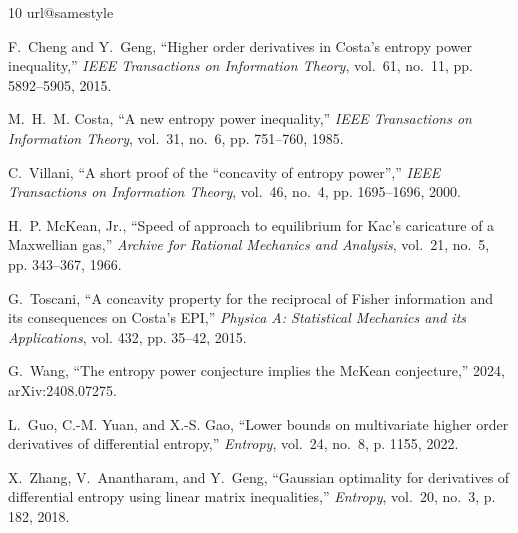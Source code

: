 \documentclass[10pt,letterpaper,journal]{IEEEtran}
\theoremstyle{plain}
\theoremstyle{definition}
\begin{document}
\begin{thebibliography}{10}
\providecommand{\url}[1]{#1}
\csname url@samestyle\endcsname
\providecommand{\newblock}{\relax}
\providecommand{\bibinfo}[2]{#2}
\providecommand{\BIBentrySTDinterwordspacing}{\spaceskip=0pt\relax}
\providecommand{\BIBentryALTinterwordstretchfactor}{4}
\providecommand{\BIBentryALTinterwordspacing}{\spaceskip=\fontdimen2\font plus
\BIBentryALTinterwordstretchfactor\fontdimen3\font minus
  \fontdimen4\font\relax}
\providecommand{\BIBforeignlanguage}[2]{{%
\expandafter\ifx\csname l@#1\endcsname\relax
\typeout{** WARNING: IEEEtran.bst: No hyphenation pattern has been}%
\typeout{** loaded for the language `#1'. Using the pattern for}%
\typeout{** the default language instead.}%
\else
\language=\csname l@#1\endcsname
\fi
#2}}
\providecommand{\BIBdecl}{\relax}
\BIBdecl

F.~Cheng and Y.~Geng, ``Higher order derivatives in {Costa}'s entropy power
  inequality,'' \emph{IEEE Transactions on Information Theory}, vol.~61,
  no.~11, pp. 5892--5905, 2015.

M.~H.~M. Costa, ``A new entropy power inequality,'' \emph{IEEE Transactions on
  Information Theory}, vol.~31, no.~6, pp. 751--760, 1985.

C.~Villani, ``A short proof of the ``concavity of entropy power'','' \emph{IEEE
  Transactions on Information Theory}, vol.~46, no.~4, pp. 1695--1696, 2000.

H.~P. McKean, Jr., ``Speed of approach to equilibrium for {Kac}'s caricature of
  a {Maxwellian} gas,'' \emph{Archive for Rational Mechanics and Analysis},
  vol.~21, no.~5, pp. 343--367, 1966.

G.~Toscani, ``A concavity property for the reciprocal of {Fisher} information
  and its consequences on {Costa}'s {EPI},'' \emph{Physica A: Statistical
  Mechanics and its Applications}, vol. 432, pp. 35--42, 2015.

G.~Wang, ``The entropy power conjecture implies the {McKean} conjecture,''
  2024, arXiv:2408.07275.

L.~Guo, C.-M. Yuan, and X.-S. Gao, ``Lower bounds on multivariate higher order
  derivatives of differential entropy,'' \emph{Entropy}, vol.~24, no.~8, p.
  1155, 2022.

X.~Zhang, V.~Anantharam, and Y.~Geng, ``Gaussian optimality for derivatives of
  differential entropy using linear matrix inequalities,'' \emph{Entropy},
  vol.~20, no.~3, p. 182, 2018.


\end{thebibliography}
\end{document}
